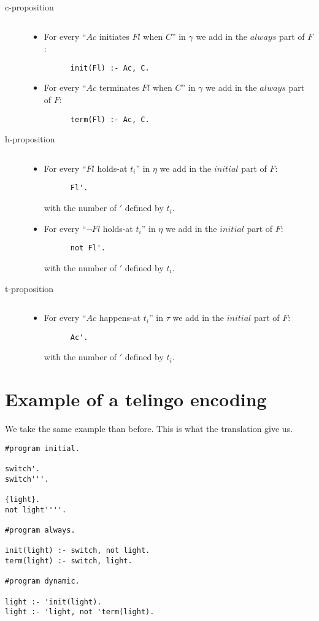 \begin{description}
  \item[c-proposition] $ $
    \begin{itemize}
    \item For every “$Ac$ initiates $Fl$ when $C$” in $\gamma$ we add in the $always$ part of $F$:
    \begin{lstlisting}
      init(Fl) :- Ac, C.
    \end{lstlisting}
    \item For every “$Ac$ terminates $Fl$ when $C$” in $\gamma$ we add in the $always$ part of $F$:
    \begin{lstlisting}
      term(Fl) :- Ac, C.
    \end{lstlisting}
  \end{itemize}
  \item[h-proposition] $ $
  \begin{itemize}
    \item For every “$Fl$ holds-at $t_i$” in $\eta$ we add in the $initial$ part of $F$:
    \begin{lstlisting}
      Fl'.
      \end{lstlisting}
    with the number of $'$ defined by $t_i$.
    \item For every “$\neg Fl$ holds-at $t_i$” in $\eta$ we add in the $initial$ part of $F$:
    \begin{lstlisting}
      not Fl'.
      \end{lstlisting}
    with the number of $'$ defined by $t_i$.
  \end{itemize}
  \item[t-proposition] $ $
  \begin{itemize}
    \item For every “$Ac$ happens-at $t_i$” in $\tau$ we add in the $initial$ part of $F$:
    \begin{lstlisting}
      Ac'.
      \end{lstlisting}
    with the number of $'$ defined by $t_i$.
  \end{itemize}
\end{description}

\section{Example of a telingo encoding}

We take the same example than before.
This is what the translation give us.

\begin{lstlisting}
#program initial.

switch'.
switch'''.

{light}.
not light''''.

#program always.

init(light) :- switch, not light.
term(light) :- switch, light.

#program dynamic.

light :- 'init(light).
light :- 'light, not 'term(light).
\end{lstlisting}
